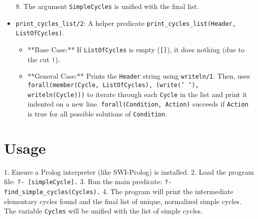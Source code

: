 \documentclass[12pt,a4paper]{article}
\begin{document}
\begin{itemize}
\begin{itemize}
            \end{itemize}
        8. The argument \texttt{SimpleCycles} is unified with the final list.
    \item \texttt{print\_cycles\_list/2}: A helper predicate \texttt{print\_cycles\_list(Header, ListOfCycles)}.
        \begin{itemize}
            \item **Base Case:** If \texttt{ListOfCycles} is empty (\texttt{[]}), it does nothing (due to the cut \texttt{!}).
            \item **General Case:** Prints the \texttt{Header} string using \texttt{writeln/1}. Then, uses \texttt{forall(member(Cycle, ListOfCycles), (write('  '), writeln(Cycle)))} to iterate through each \texttt{Cycle} in the list and print it indented on a new line. \texttt{forall(Condition, Action)} succeeds if \texttt{Action} is true for all possible solutions of \texttt{Condition}.
        \end{itemize}
\end{itemize}

\section{Usage}

1.  Ensure a Prolog interpreter (like SWI-Prolog) is installed.
2.  Load the program file:
    \texttt{?- [simpleCycle].}
3.  Run the main predicate:
    \texttt{?- find\_simple\_cycles(Cycles).}
4.  The program will print the intermediate elementary cycles found and the final list of unique, normalized simple cycles. The variable \texttt{Cycles} will be unified with the list of simple cycles.
\end{document}
